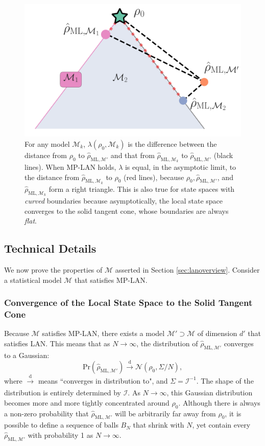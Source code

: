 \documentclass[aps,pra, twocolumn]{revtex4-1}
\newcommand{\M}{\mathcal{M}}
\newcommand{\rhohat}{\hat{\rho}}
\newcommand{\rhoML}[1]{\rhohat_{\scriptscriptstyle{\mathrm{ML},#1}}}
\begin{document}
\begin{figure}
\includegraphics[width=.75\columnwidth]{Images/Figure_3.pdf}
 \caption{For any model $\M_{k}$, $\lambda(\rho_{0}, \M_{k})$ is the difference between the distance from $\rho_{0}$ to $\rhoML{\M'}$ and that from $\rhoML{\M_{k}}$ to $\rhoML{\M'}$ (black lines). When MP-LAN holds, $\lambda$ is equal, in the asymptotic limit, to the distance from $\rhoML{\M_{k}}$ to $\rho_{0}$ (red lines), because $\rho_{0}, \rhoML{\M'}$, and $\rhoML{\M_{k}}$ form a right triangle. This is also true for state spaces with \emph{curved} boundaries because asymptotically, the local state space converges to the solid tangent cone, whose boundaries are always \emph{flat}.}
\label{fig:llrs_MP-LAN}
\end{figure}

\subsection{Technical Details}

We now prove the properties of $\M$ asserted in Section \ref{sec:lanoverview}. Consider a statistical model $\M$ that satisfies MP-LAN. 

\subsubsection{Convergence of the Local State Space to the Solid Tangent Cone}

Because $\M$ satisfies MP-LAN, there exists a model $\M' \supset \M$ of dimension $d'$ that satisfies LAN. This means that as $N \rightarrow \infty$, the distribution of $\rhoML{\M'}$ converges to a Gaussian:
\[\mathrm{Pr}(\rhoML{\M'})\xrightarrow[]{\text{d}} \mathcal{N}(\rho_{0}, \Sigma/N),\]
where $\xrightarrow[]{\text{d}}$ means ``converges in distribution to", and $\Sigma = \mathcal{I}^{-1}$.
The shape of the distribution is entirely determined by $\mathcal{I}$. As $N \rightarrow \infty$, this Gaussian distribution becomes more and more tightly concentrated around $\rho_{0}$. Although there is always a non-zero probability that $\rhoML{\M'}$ will be arbitrarily far away from $\rho_{0}$, it is possible to define a sequence of balls $B_{N}$ that shrink with $N$, yet contain every $\rhoML{\M'}$ with probability 1 as $N \rightarrow \infty$.
\end{document}
